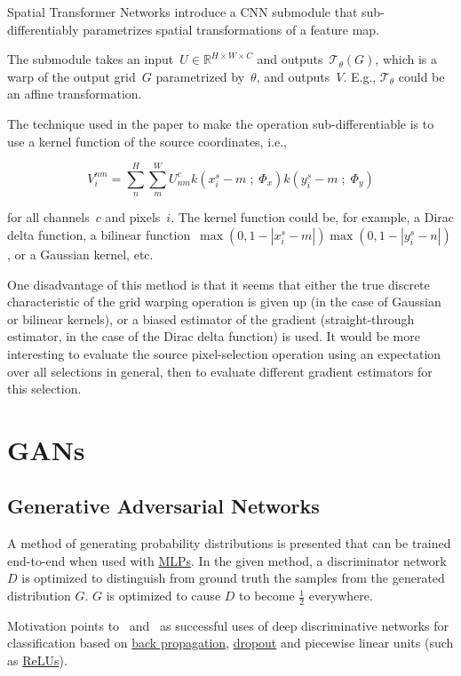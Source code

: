\documentclass[a4paper, 12pt]{article}
\begin{document}
Spatial Transformer Networks introduce a CNN submodule that sub-differentiably
parametrizes spatial transformations of a feature map.

The submodule takes an input~$U \in \mathbb{R}^{H \times W \times C}$ and
outputs~$\mathcal{T}_\theta(G)$, which is a warp of the output grid~$G$
parametrized by~$\theta$, and outputs~$V$. E.g., $\mathcal{T}_\theta$ could be
an affine transformation.

The technique used in the paper to make the operation sub-differentiable is to
use a kernel function of the source coordinates, i.e.,

\begin{equation*}
        V_i^{nm} = \sum_n^H \sum_m^W U^c_{nm} k(x_i^s - m\;;\; \Phi_x)
                k(y_i^s - m\;;\; \Phi_y)
\end{equation*}

for all channels~$c$ and pixels~$i$. The kernel function could be, for example,
a Dirac delta function, a bilinear
function~$\max(0, 1 - |x_i^s - m|)\max(0, 1 - |y_i^s - n|)$, or a Gaussian
kernel, etc.

One disadvantage of this method is that it seems that either the true discrete
characteristic of the grid warping operation is given up (in the case of
Gaussian or bilinear kernels), or a biased estimator of the gradient
(straight-through estimator, in the case of the Dirac delta function) is used.
It would be more interesting to evaluate the source pixel-selection operation
using an expectation over all selections in general, then to evaluate different
gradient estimators for this selection.


\section{GANs}


\subsection{Generative Adversarial Networks\citet{NIPS2014_5423}}
\label{gan}

A method of generating probability distributions is presented that can be
trained end-to-end when used with \hyperref[multilayer_perceptron]{MLPs}. In
the given method, a discriminator network $D$ is optimized to distinguish from
ground truth the samples from the generated distribution $G$. $G$ is optimized
to cause $D$ to become $\frac{1}{2}$ everywhere.

Motivation points to~\citet{deepSpeechReviewSPM2012} and~\citet{NIPS2012_4824} as
successful uses of deep discriminative networks for classification based on
\hyperref[backprop]{back propagation}, \hyperref[dropout]{dropout} and
piecewise linear units (such as \hyperref[rectified_linear_units]{ReLUs}).
\end{document}
